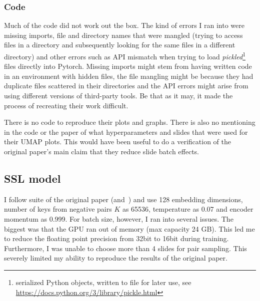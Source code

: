 \documentclass[10pt,twocolumn,letterpaper]{article}
\begin{document}
\subsubsection{Code}\label{subsubsec:code}
Much of the code did not work out the box. The kind of errors I ran into were missing imports, file and directory names that were mangled (trying to access files in a directory and subsequently looking for the same files in a different directory) and other errors such as API mismatch when trying to load \textit{pickled}\footnote{serialized Python objects, written to file for later use, see \href{https://docs.python.org/3/library/pickle.html}{https://docs.python.org/3/library/pickle.html}} files directly into Pytorch. Missing imports might stem from having written code in an environment with hidden files, the file mangling might be because they had duplicate files scattered in their directories and the API errors might arise from using different versions of third-party tools. Be that as it may, it made the process of recreating their work difficult.

There is no code to reproduce their plots and graphs. There is also no mentioning in the code or the paper of what hyperparameters and slides that were used for their \gls{UMAP} plots. This would have been useful to do a verification of the original paper's main claim that they reduce slide batch effects.

\subsection{SSL model}\label{subsec:mymodel}
I follow suite of the original paper (and~\cite{moco}) and use 128 embedding dimensions, number of keys from negative pairs $K$ as 65536, temperature as 0.07 and encoder momentum as 0.999. For batch size, however, I ran into several issues. 
The biggest was that the \gls{GPU} ran out of memory (max capacity 24 GB). This led me to reduce the floating point precision from 32bit to 16bit during training. Furthermore, I was unable to choose more than 4 slides for pair sampling. This severely limited my ability to reproduce the results of the original paper.
\end{document}
